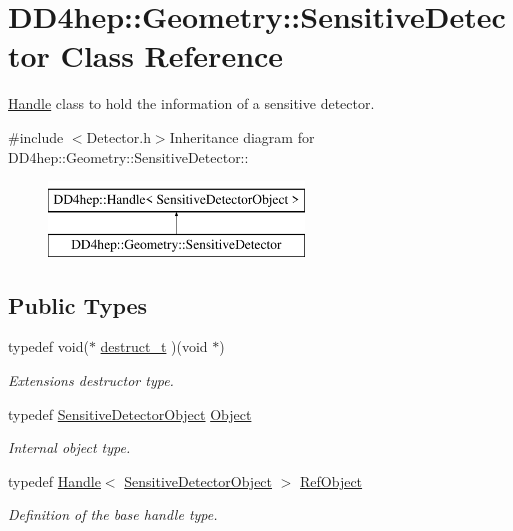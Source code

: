 \hypertarget{class_d_d4hep_1_1_geometry_1_1_sensitive_detector}{
\section{DD4hep::Geometry::SensitiveDetector Class Reference}
\label{class_d_d4hep_1_1_geometry_1_1_sensitive_detector}
}


\hyperlink{class_d_d4hep_1_1_handle}{Handle} class to hold the information of a sensitive detector.  


{\ttfamily \#include $<$Detector.h$>$}Inheritance diagram for DD4hep::Geometry::SensitiveDetector::\begin{figure}[H]
\begin{center}
\leavevmode
\includegraphics[height=2cm]{class_d_d4hep_1_1_geometry_1_1_sensitive_detector}
\end{center}
\end{figure}
\subsection*{Public Types}
\begin{DoxyCompactItemize}
\item 
typedef void($\ast$ \hyperlink{class_d_d4hep_1_1_geometry_1_1_sensitive_detector_a5da3147260d9ed63a0e840e9c1ab43f3}{destruct\_\-t} )(void $\ast$)
\begin{DoxyCompactList}\small\item\em Extensions destructor type. \item\end{DoxyCompactList}\item 
typedef \hyperlink{class_d_d4hep_1_1_geometry_1_1_sensitive_detector_object}{SensitiveDetectorObject} \hyperlink{class_d_d4hep_1_1_geometry_1_1_sensitive_detector_a0d3dbe95cad52849050e35e70a5cf784}{Object}
\begin{DoxyCompactList}\small\item\em Internal object type. \item\end{DoxyCompactList}\item 
typedef \hyperlink{class_d_d4hep_1_1_handle}{Handle}$<$ \hyperlink{class_d_d4hep_1_1_geometry_1_1_sensitive_detector_object}{SensitiveDetectorObject} $>$ \hyperlink{class_d_d4hep_1_1_geometry_1_1_sensitive_detector_a6283afdc6a1de8128bd6aea54f030014}{RefObject}
\begin{DoxyCompactList}\small\item\em Definition of the base handle type. \item\end{DoxyCompactList}\end{DoxyCompactItemize}
